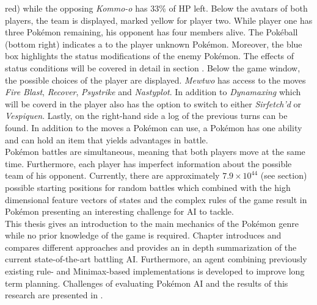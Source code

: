 red) while the opposing \textit{Kommo-o} has 33\% of \ac{HP} left. Below the avatars of both players,
the team is displayed, marked yellow for player two. While player one has three Pokémon remaining,
his opponent has four members alive. The Pokéball (bottom right) indicates a to the player unknown Pokémon.
Moreover, the blue box highlights the status modifications of the enemy Pokémon. The effects of status conditions
will be covered in detail in section . Below the game window, the possible choices of the
player are displayed. \textit{Mewtwo} has access to the moves \textit{Fire Blast}, \textit{Recover}, \textit{Psystrike}
and \textit{Nastyplot}. In addition to \textit{Dynamaxing} which will be coverd in  the player
also has the option to switch to either \textit{Sirfetch'd} or \textit{Vespiquen}. Lastly,
on the right-hand side a log of the previous turns can be found. In addition to the moves a Pokémon can use,
a Pokémon has one ability and can hold an item that yields advantages in battle. 
\\
Pokémon battles are simultaneous, meaning that both players move at the same time. Furthermore, each player has imperfect
information about the possible team of his opponent. 
Currently, there are approximately $7.9 \times 10^{44}$ 
(see section) possible
starting positions for random battles which combined with the high dimensional feature vectors of states 
and the complex rules of the game result in Pokémon presenting an interesting challenge for AI to tackle. 
\\
This thesis gives an introduction to the main mechanics of the Pokémon genre while no prior knowledge of the 
game is required. 
Chapter  introduces and compares different approaches and provides an in depth summarization
of the current state-of-the-art battling AI. 
Furthermore, an agent combining previously existing rule- and 
Minimax-based implementations is developed to improve long term planning.
Challenges of evaluating Pokémon AI and the results of this research
are presented in .